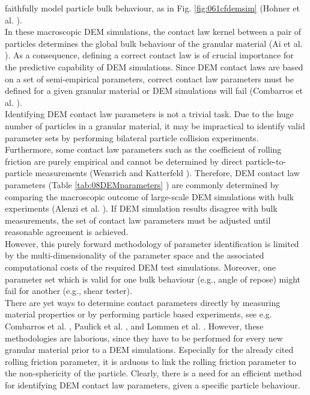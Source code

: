 faithfully model particle bulk behaviour, as in Fig. \ref{fig:061cfdemsim}
(Hohner et al. \cite{RefWorks:86}).\\
 
In these macroscopic \acs{DEM} simulations, the contact law kernel between a 
pair of particles determines the global bulk behaviour of the granular material (Ai et al. \cite{RefWorks:131}). 
As a consequence, defining a correct contact law is of crucial importance for the predictive 
capability of \acs{DEM} simulations. 
Since \acs{DEM} contact laws are based 
on a set of semi-empirical parameters, correct contact law 
parameters must be defined for a given granular material
or \acs{DEM} simulations will fail (Combarros et al. \cite{RefWorks:177}). \\
Identifying \acs{DEM} contact law parameters is not a trivial task. 
Due to the huge number of particles in a granular material, it
may be impractical to identify valid parameter sets by performing bilateral 
particle collision experiments. 
Furthermore, some contact law parameters such as the coefficient of rolling
friction are purely empirical and cannot be determined by direct 
particle-to-particle measurements (Wensrich and Katterfeld \cite{RefWorks:87}).
Therefore, \acs{DEM} contact law parameters (Table \ref{tab:08DEMparameters}
) are
commonly determined by comparing the macroscopic outcome of large-scale \acs{DEM}
simulations with bulk experiments (Alenzi et al. \cite{RefWorks:91}). 
If \acs{DEM} simulation results disagree with bulk measurements, the set of contact
law parameters must be adjusted until reasonable agreement is achieved.\\
However, this purely forward methodology of parameter identification is limited by 
the multi-dimensionality of the parameter space and the associated computational costs of the required 
\acs{DEM} test simulations. 
Moreover, one parameter set which is valid for one bulk behaviour (e.g., angle
of repose) might fail for another (e.g., shear tester). \\
There are yet ways to determine contact parameters directly by measuring
material properties or by performing particle based experiments, see e.g. Combarros et al. \cite{RefWorks:177}, 
Paulick et al. \cite{RefWorks:181}, and Lommen et al. \cite{RefWorks:186}. 
However, these methodologies are laborious, 
since they have to be performed for every new granular material prior to a \acs{DEM}
simulations. 
Especially for the already cited rolling friction parameter, it is arduous to
link the rolling friction parameter to the non-sphericity of the particle. Clearly, there is a
need for an efficient method for identifying \acs{DEM} contact law parameters, given
a specific particle behaviour.



